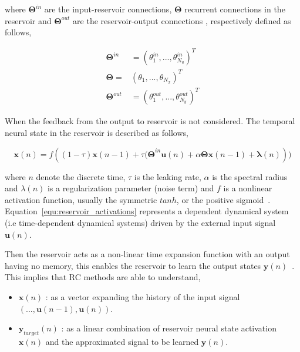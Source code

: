 \documentclass{WitsPhysicsReport}
\begin{document}
where $\mathbf{\Theta}^{in}$ are the input-reservoir connections, $\mathbf{\Theta}$ recurrent connections in the reservoir and $\mathbf{\Theta}^{out}$ are the reservoir-output connections , respectively  defined as follows,

\begin{eqnarray}
{\mathbf{\Theta}}^{in} &= ({\theta}^{in}_{1},...,{\theta}^{in}_{N_{u}})^{T} \\
{\mathbf{\Theta}} =& ({\theta}_{1},...,{\theta}_{N_{x}})^{T}\\
{\mathbf{\Theta}}^{out} &= ({\theta}^{out}_{1},...,{\theta}^{out}_{N_{y}})^{T}
\label{equ:weight_vectors}
\end{eqnarray}


When the feedback from the output to reservoir is not considered. The temporal neural state in the reservoir is described as follows,
 
 \begin{equation}
\mathbf{x}(n) =
f({(1-\tau)\mathbf{x}(n-1)  + \tau(\mathbf{\Theta}}^{in} \mathbf{u}(n) + \alpha{\mathbf{\Theta}} \mathbf{x}(n-1) +  \mathbf{\lambda}(n)) )
\label{equ:reservoir_activations}
\end{equation}
 
where $n$ denote the discrete time, $\tau$ is the  leaking rate, $\alpha$ is the spectral radius and ${\lambda}(n)$ is a regularization parameter (noise term) and  $f$ is a nonlinear activation function, usually the symmetric $tanh$, or the positive sigmoid~\cite{lukovsevivcius2009reservoir}. Equation~\ref{equ:reservoir_activations} represents  a dependent dynamical system (i.e time-dependent dynamical systems) driven by the external input signal $\mathbf{u}(n)$.
 
Then the reservoir acts as a non-linear time expansion function with an output having no memory, this enables the reservoir to learn the output states $\mathbf{y}(n)$~\cite{Schaetti2015}. This implies that RC methods are able to understand, 
 
 \begin{itemize}
 \item  $\mathbf{x}(n)$ : as a vector expanding the history of the input signal $(...,\mathbf{u}(n-1),\mathbf{u}(n))$.
 \item $\mathbf{y}_{target}(n)$ : as a linear combination of reservoir neural state activation $\mathbf{x}(n)$ and the approximated signal to be learned $\mathbf{y}(n)$.
 \label{item:ESN}
 \end{itemize}
 
\end{document}
